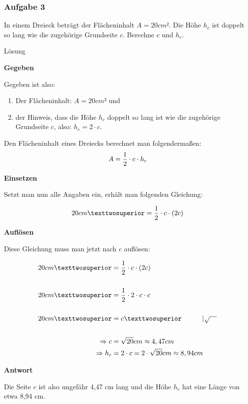 \documentclass[
  ngerman,
]{book}
\providecommand{\tightlist}{%
  \setlength{\itemsep}{0pt}\setlength{\parskip}{0pt}}
\begin{document}
\hypertarget{aufgabe-3-1}{%
\subsubsection*{Aufgabe 3}\label{aufgabe-3-1}}

In einem Dreieck beträgt der Flächeninhalt \(A=20cm²\). Die Höhe \(h_c\) ist doppelt so lang wie die zugehörige Grundseite \(c\). Berechne \(c\) und \(h_c\).

Lösung

\textbf{Gegeben}

Gegeben ist also:

\begin{enumerate}
\def\labelenumi{\arabic{enumi}.}
\tightlist
\item
  Der Flächeninhalt: \(A=20cm²\) und
\item
  der Hinweis, dass die Höhe \(h_c\) doppelt so lang ist wie die zugehörige Grundseite \(c\), also: \(h_c= 2 \cdot c\).
\end{enumerate}

Den Flächeninhalt eines Dreiecks berechnet man folgendermaßen:
\[ A = {1 \over 2} \cdot c \cdot h_c \]

\textbf{Einsetzen}

Setzt man nun alle Angaben ein, erhält man folgenden Gleichung:

\[ 20 cm² = {1 \over 2} \cdot c \cdot (2c) \]

\textbf{Auflösen}

Diese Gleichung muss man jetzt nach \(c\) auflösen:

\[ \begin{align} 20 cm² &= {1 \over 2} \cdot c \cdot (2c) \\
{}\\
20 cm² &= {1 \over 2} \cdot 2 \cdot c \cdot c \\
{}\\
20 cm² &= c² \quad\quad\quad |\sqrt{\quad}\\
{}\\
\Rightarrow c &= \sqrt{20} cm \approx 4,47 cm \\
\Rightarrow h_c &= 2 \cdot c = 2 \cdot \sqrt{20} cm \approx 8,94cm
\end{align}\]

\textbf{Antwort}

Die Seite \(c\) ist also ungefähr 4,47 cm lang und die Höhe \(h_c\) hat eine Länge von etwa 8,94 cm.

\hypertarget{section-5}{%
\subsubsection*{}\label{section-5}}
\end{document}
